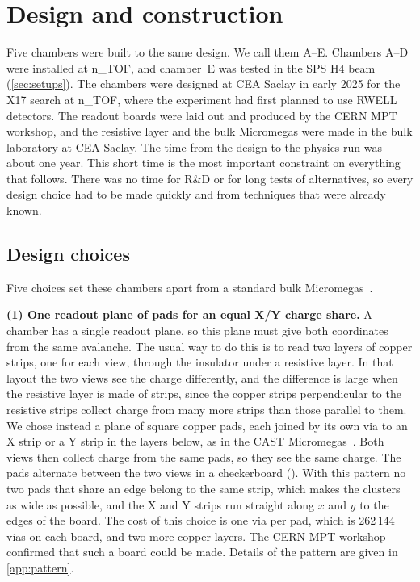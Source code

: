 \section{Design and construction}\label{sec:design}

Five chambers were built to the same design. We call them A--E. Chambers A--D were installed at n\_TOF, and chamber~E was
tested in the SPS H4 beam (\cref{sec:setups}). The chambers were designed at CEA Saclay in early 2025 for the X17 search
at n\_TOF, where the experiment had first planned to use \textmu RWELL detectors. The readout boards were laid out and
produced by the CERN MPT workshop, and the resistive layer and the bulk Micromegas were made in the bulk laboratory at
CEA Saclay. The time from the design to the physics run was about one year. This short time is the most important
constraint on everything that follows. There was no time for R\&D or for long tests of alternatives, so every design
choice had to be made quickly and from techniques that were already known.

\subsection{Design choices}\label{sec:design_choices}
Five choices set these chambers apart from a standard bulk Micromegas~\cite{Giomataris2006bulk}.

\textbf{(1) One readout plane of pads for an equal X/Y charge share.} A chamber has a single readout plane, so this
plane must give both coordinates from the same avalanche. The usual way to do this is to read two layers of copper
strips, one for each view, through the insulator under a resistive layer. In that layout the two views see the charge
differently, and the difference is large when the resistive layer is made of strips, since the copper strips
perpendicular to the resistive strips collect charge from many more strips than those parallel to them. We chose
instead a plane of square copper pads, each joined by its own via to an X strip or a Y strip in the layers below, as
in the CAST Micromegas~\cite{Abbon2007CAST}. Both views then collect charge from the same pads, so they see the same
charge. The pads alternate between the two views in a checkerboard (). With this pattern no two
pads that share an edge belong to the same strip, which makes the clusters as wide as possible, and the X and Y strips
run straight along $x$ and $y$ to the edges of the board. The cost of this choice is one via per pad, which is
262\,144 vias on each board, and two more copper layers. The CERN MPT workshop confirmed that such a board could be
made. Details of the pattern are given in \cref{app:pattern}.

